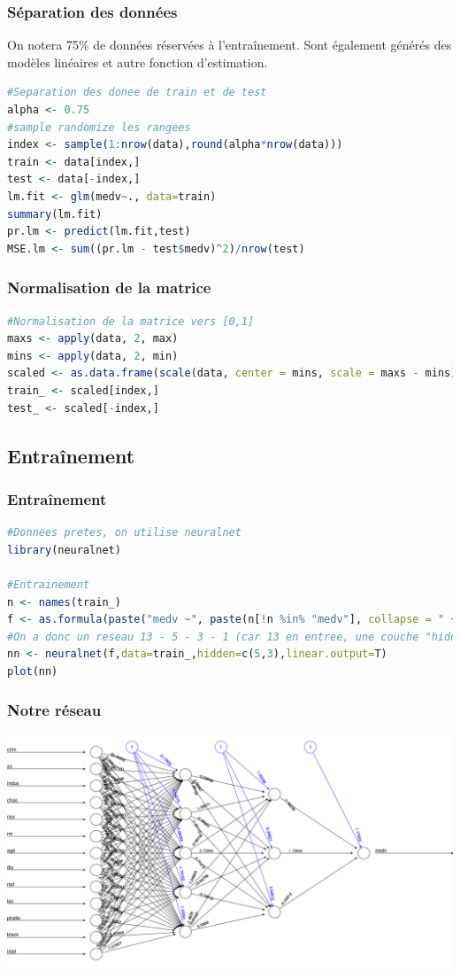 \documentclass[compress]{beamer}
\begin{document}
\begin{frame}[fragile]
\frametitle{Séparation des données}
On notera 75\% de données réservées à l'entraînement. Sont également générés des modèles linéaires et autre fonction d'estimation.
\begin{lstlisting}[language=R]
#Separation des donee de train et de test
alpha <- 0.75
#sample randomize les rangees
index <- sample(1:nrow(data),round(alpha*nrow(data)))
train <- data[index,]
test <- data[-index,]
lm.fit <- glm(medv~., data=train)
summary(lm.fit)
pr.lm <- predict(lm.fit,test)
MSE.lm <- sum((pr.lm - test$medv)^2)/nrow(test)
\end{lstlisting}
\end{frame}

\begin{frame}[fragile]
\frametitle{Normalisation de la matrice}
\begin{lstlisting}[language=R]
#Normalisation de la matrice vers [0,1]
maxs <- apply(data, 2, max) 
mins <- apply(data, 2, min)
scaled <- as.data.frame(scale(data, center = mins, scale = maxs - mins))
train_ <- scaled[index,]
test_ <- scaled[-index,]
\end{lstlisting}
\end{frame}

\subsection{Entraînement}
\begin{frame}[fragile]
\frametitle{Entraînement}
\begin{lstlisting}[language=R]
#Donnees pretes, on utilise neuralnet
library(neuralnet)
	
#Entrainement
n <- names(train_)
f <- as.formula(paste("medv ~", paste(n[!n %in% "medv"], collapse = " + ")))
#On a donc un reseau 13 - 5 - 3 - 1 (car 13 en entree, une couche "hidden" de 5, une couche "hidden" de 3 et la sortie)
nn <- neuralnet(f,data=train_,hidden=c(5,3),linear.output=T)
plot(nn)
\end{lstlisting}
\end{frame}

\begin{frame}\frametitle{Notre réseau}
	\includegraphics[width=\linewidth]{img/nn_boston}
\end{frame}	
\end{document}
